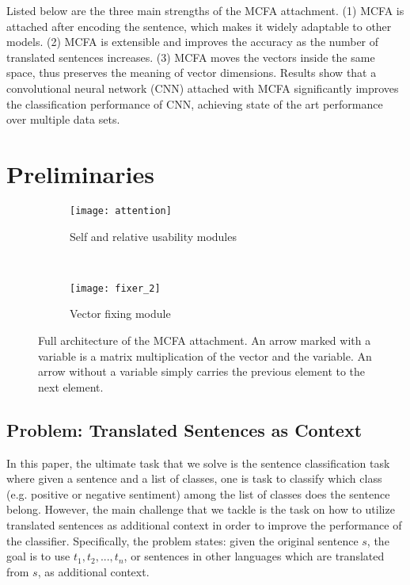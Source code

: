 \documentclass{article}
\begin{document}
Listed below are the three main strengths of the MCFA attachment.
(1) 
MCFA is attached
after encoding the sentence, 
which makes it widely adaptable to other models.
(2) 
MCFA is extensible and improves the accuracy as the number of translated sentences increases.
(3) 
MCFA 
moves the vectors inside the same space, thus preserves the meaning of vector dimensions.
Results show that a convolutional neural network (CNN) attached with MCFA significantly improves the classification performance of CNN, achieving state of the art performance over multiple data sets. 


\section{Preliminaries}



\begin{figure*}[t]
    \centering
    \begin{subfigure}[t]{0.45\textwidth}
        \centering
        \texttt{[image: attention]}
        \caption{Self and relative usability modules}
        \label{fig:sga}
    \end{subfigure}
    ~ 
    \begin{subfigure}[t]{0.45\textwidth}
        \centering
        \texttt{[image: fixer\_2]}
        \caption{Vector fixing module}
        \label{fig:vf}
    \end{subfigure}
    \caption{Full architecture of the MCFA attachment. An arrow marked with a variable is a matrix multiplication of the vector and the variable. An arrow without a variable simply carries the previous element to the next element.}
    \label{fig:arch}
\end{figure*}

\subsection{Problem: Translated Sentences as Context}

In this paper, the ultimate task that we solve is the sentence classification task where given a sentence and a list of classes, one is task to classify which class (e.g. positive or negative sentiment) among the list of classes does the sentence belong. However, the main challenge that we tackle is the task on how to utilize translated sentences as additional context in order to improve the performance of the classifier.
Specifically, the problem states: given the original sentence $s$, the goal is to use $t_1, t_2, ..., t_n$, or sentences in other languages which are translated from $s$, as additional context.
\end{document}
